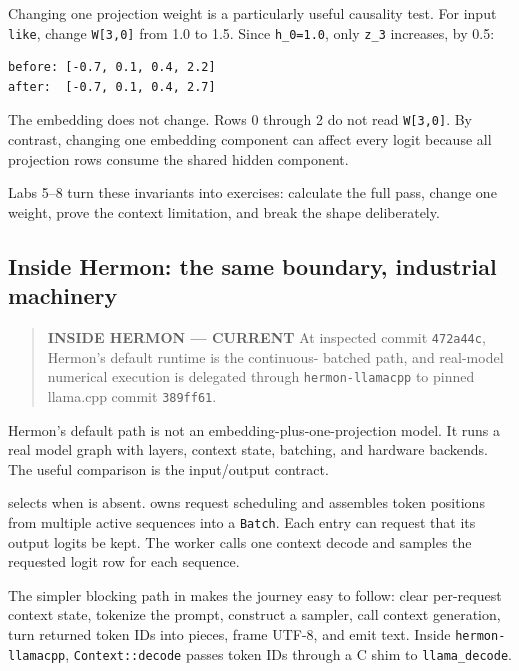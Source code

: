 \documentclass[
  10pt,
]{article}
\begin{document}
Changing one projection weight is a particularly useful causality test.
For input \texttt{like}, change \texttt{W{[}3,0{]}} from 1.0 to 1.5.
Since \texttt{h\_0=1.0}, only \texttt{z\_3} increases, by 0.5:

\begin{verbatim}
before: [-0.7, 0.1, 0.4, 2.2]
after:  [-0.7, 0.1, 0.4, 2.7]
\end{verbatim}

The embedding does not change. Rows 0 through 2 do not read
\texttt{W{[}3,0{]}}. By contrast, changing one embedding component can
affect every logit because all projection rows consume the shared hidden
component.

Labs 5--8 turn these invariants into exercises: calculate the full pass,
change one weight, prove the context limitation, and break the shape
deliberately.

\subsection{Inside Hermon: the same boundary, industrial
machinery}\label{inside-hermon-the-same-boundary-industrial-machinery}

\begin{quote}
\textbf{INSIDE HERMON --- CURRENT} At inspected commit \texttt{472a44c},
Hermon's default runtime is the continuous- batched path, and real-model
numerical execution is delegated through \texttt{hermon-llamacpp} to
pinned llama.cpp commit \texttt{389ff61}.
\end{quote}

Hermon's default path is not an embedding-plus-one-projection model. It
runs a real model graph with layers, context state, batching, and
hardware backends. The useful comparison is the input/output contract.

\texttt{} selects
\texttt{} when
\texttt{} is absent.
\texttt{} owns request
scheduling and assembles token positions from multiple active sequences
into a \texttt{Batch}. Each entry can request that its output logits be
kept. The worker calls one context decode and samples the requested
logit row for each sequence.

The simpler blocking path in
\texttt{} makes the journey
easy to follow: clear per-request context state, tokenize the prompt,
construct a sampler, call context generation, turn returned token IDs
into pieces, frame UTF-8, and emit text. Inside
\texttt{hermon-llamacpp}, \texttt{Context::decode} passes token IDs
through a C shim to \texttt{llama\_decode}.
\end{document}
